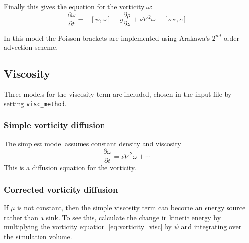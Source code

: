 \documentclass[12pt,a4paper]{article}
\begin{document}
Finally this gives the equation for the vorticity $\omega$:
\begin{equation}
\frac{\partial\omega}{\partial t} = -\left[\psi, \omega\right] - g\frac{\partial\rho}{\partial z} + \nu\nabla^2\omega - \left[\sigma\kappa, c\right]
\end{equation}

In this model the Poisson brackets are implemented using Arakawa's $2^{nd}$-order advection scheme.

\subsection{Viscosity}

Three models for the viscosity term are included, chosen in the input file
by setting \texttt{visc\_method}.

\subsubsection{Simple vorticity diffusion}
\label{sec:visc0}

The simplest model assumes constant density and viscosity
\begin{equation}
  \frac{\partial\omega}{\partial t} = \nu\nabla^2\omega + \cdots
  \label{eq:vorticity_visc}
\end{equation}
This is a diffusion equation for the vorticity.

\subsubsection{Corrected vorticity diffusion}

If $\mu$ is not constant, then the simple viscosity term can become an
energy source rather than a sink. To see this, calculate the change
in kinetic energy by multiplying the vorticity equation~\ref{eq:vorticity_visc}
by $\psi$ and integrating over the simulation volume.
\end{document}
